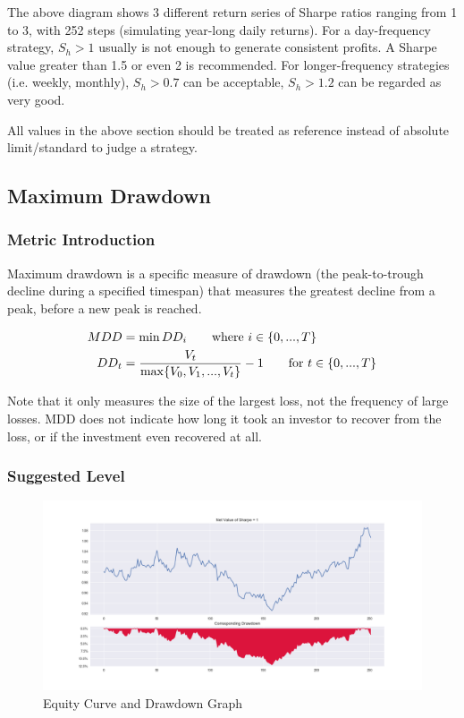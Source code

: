 \documentclass[12pt]{article}
\begin{document}
The above diagram shows 3 different return series of Sharpe ratios ranging from 1 to 3, with 252 steps (simulating year-long daily returns). For a day-frequency strategy, \(S_h > 1\) usually is not enough to generate consistent profits. A Sharpe value greater than 1.5 or even 2 is recommended. For longer-frequency strategies (i.e. weekly, monthly), \(S_h > 0.7\) can be acceptable, \(S_h > 1.2\) can be regarded as very good.

All values in the above section should be treated as reference instead of absolute limit/standard to judge a strategy.

\subsection{Maximum Drawdown}

\subsubsection*{Metric Introduction}

Maximum drawdown is a specific measure of drawdown (the peak-to-trough decline during a specified timespan) that measures the greatest decline from a peak, before a new peak is reached.

\begin{align*}
  MDD &= \min DD_i \tag*{where \(i \in {\{0, ..., T \}} \)} \\
  DD_t &= \frac{V_t}{\max \{V_0, V_1, ..., V_t \}}-1 \tag*{for \(t \in {\{0, ..., T \}} \)}
\end{align*}

Note that it only measures the size of the largest loss, not the frequency of large losses. MDD does not indicate how long it took an investor to recover from the loss, or if the investment even recovered at all.

\subsubsection*{Suggested Level}

\begin{figure}[h!]
  \centering
  \includegraphics[scale=0.39]{./ref/figure/drawdown_nav_600.png}
  \caption{Equity Curve and Drawdown Graph}
  \label{fig:drawdown}
\end{figure}
\end{document}
